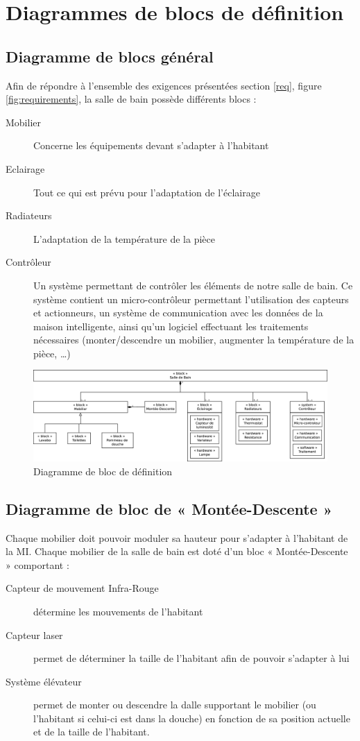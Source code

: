 \chapter{Diagrammes de blocs de définition}
\section{Diagramme de blocs général}
Afin de répondre à l'ensemble des exigences présentées section \ref{req}, figure \ref{fig:requirements}, la salle de bain possède différents blocs : 
\begin{description}
	\item[Mobilier] Concerne les équipements devant s'adapter à l'habitant
	\item[Eclairage] Tout ce qui est prévu pour l'adaptation de l'éclairage 
	\item[Radiateurs] L'adaptation de la température de la pièce
	\item[Contrôleur] Un système permettant de contrôler les éléments de notre salle de bain. Ce système contient un micro-contrôleur permettant l'utilisation des capteurs et actionneurs, un système de communication avec les données de la maison intelligente, ainsi qu'un logiciel effectuant les traitements nécessaires (monter/descendre un mobilier, augmenter la température de la pièce, \ldots)
\end{description}

\begin{figure}[H]
	\centering
	\includegraphics[width=1\linewidth]{diagrams/bathroom/diagramme_blocks_bdd.eps}
	\caption{Diagramme de bloc de définition}
	\label{fig:diagramme_bdd}
\end{figure}
\vfill
\pagebreak
\section{Diagramme de bloc de « Montée-Descente »}
Chaque mobilier doit pouvoir moduler sa hauteur pour s'adapter à l'habitant de la MI. Chaque mobilier de la salle de bain est doté d'un bloc « Montée-Descente » comportant :
\begin{description}
	\item[Capteur de mouvement Infra-Rouge] détermine les mouvements de l'habitant
	\item[Capteur laser] permet de déterminer la taille de l'habitant afin de pouvoir s'adapter à lui
	\item[Système élévateur] permet de monter ou descendre la dalle supportant le mobilier (ou l'habitant si celui-ci est dans la douche) en fonction de sa position actuelle et de la taille de l'habitant.   
\end{description}

